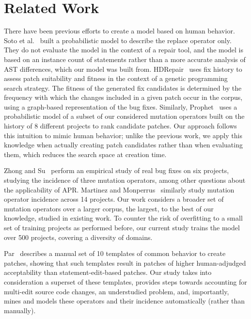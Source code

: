 \documentclass[conference]{IEEEtran}
\begin{document}
\section{Related Work} \label{relatedWork}

There have been previous efforts to create a model based on human behavior.  
Soto et al.~\cite{Soto16} 
built a probabilistic model to describe the replace 
operator only. They do not evaluate the model in the context of a repair
tool, and the model is based on an instance count of statements rather than a more 
accurate analysis of AST differences, which our model was built from.  
HDRepair~\cite{xuan16} 
uses fix history
to assess patch suitability and fitness in the context of a genetic
programming search strategy. The fitness of the generated
fix candidates is determined by the frequency with which the changes included in
a given patch occur in the corpus, using a graph-based representation of the bug
fixes.  Similarly, Prophet~\cite{long16proph} uses a
probabilistic model of a subset of our considered mutation operators built on 
the history of 8 different projects to rank candidate
patches.  Our approach follows this intuition to mimic human
behavior; unlike the previous work, we apply this knowledge when actually
creating patch candidates rather than when evaluating them, which reduces the 
search space at creation time.  

Zhong and Su~\cite{zhong15} perform an empirical study of
real bug fixes on six projects, studying the incidence of three mutation
operators, among other questions about the applicability of APR.  Martinez and
Monperrus~\cite{martinez15} similarly study mutation operator incidence across 
14 
projects. Our work considers a broader set of
mutation operators over a larger corpus, the largest, to the best of our
knowledge, studied in existing work. To counter the 
risk of overfitting to a small set of training projects as performed before, our 
current study trains the model over 500 projects, covering a diversity 
of domains.

Par~\cite{kim2013} describes a manual set of 10 templates of common behavior to
create patches, showing that such templates result in patches of higher
human-adjudged acceptability than statement-edit-based patches.  Our study takes 
into consideration a superset
of these templates, provides steps towards
accounting for multi-edit source code changes, an understudied problem, and,
importantly, mines and models these operators and their incidence automatically
(rather than manually).
\end{document}
